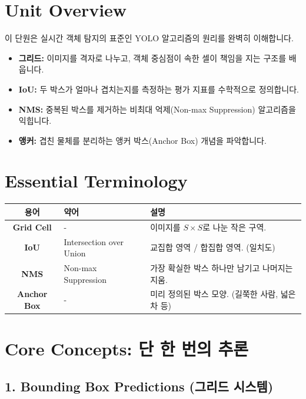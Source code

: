 \documentclass[11pt,a4paper]{book}
\theoremstyle{definition}
\begin{document}
\section{Unit Overview}
\begin{summarybox}[title={핵심 목표}]
이 단원은 실시간 객체 탐지의 표준인 YOLO 알고리즘의 원리를 완벽히 이해합니다.
\begin{itemize}
    \item \textbf{그리드:} 이미지를 격자로 나누고, 객체 중심점이 속한 셀이 책임을 지는 구조를 배웁니다.
    \item \textbf{IoU:} 두 박스가 얼마나 겹치는지를 측정하는 평가 지표를 수학적으로 정의합니다.
    \item \textbf{NMS:} 중복된 박스를 제거하는 비최대 억제(Non-max Suppression) 알고리즘을 익힙니다.
    \item \textbf{앵커:} 겹친 물체를 분리하는 앵커 박스(Anchor Box) 개념을 파악합니다.
\end{itemize}
\end{summarybox}

\section{Essential Terminology}
\begin{center}
\begin{tabular}{|c|l|l|}
\hline
\textbf{용어} & \textbf{약어} & \textbf{설명} \\ \hline
\textbf{Grid Cell} & - & 이미지를 $S \times S$로 나눈 작은 구역. \\ \hline
\textbf{IoU} & Intersection over Union & 교집합 영역 / 합집합 영역. (일치도) \\ \hline
\textbf{NMS} & Non-max Suppression & 가장 확실한 박스 하나만 남기고 나머지는 지움. \\ \hline
\textbf{Anchor Box} & - & 미리 정의된 박스 모양. (길쭉한 사람, 넓은 차 등) \\ \hline
\end{tabular}
\end{center}

\section{Core Concepts: 단 한 번의 추론}

\subsection{1. Bounding Box Predictions (그리드 시스템)}
\end{document}

